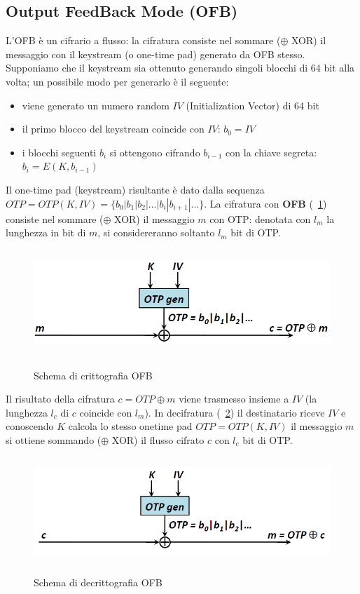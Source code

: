 \subsection{Output FeedBack Mode (OFB)} \label{par:ofb}
L'OFB è un cifrario a flusso: la cifratura consiste nel sommare ($\oplus$ XOR) il messaggio con il keystream (o one-time pad) generato da OFB stesso. Supponiamo che il keystream sia ottenuto generando singoli blocchi di 64 bit alla volta; un possibile modo per generarlo è il seguente:
\begin{itemize}
	\item viene generato un numero random $IV$ (Initialization Vector) di 64 bit
	\item il primo blocco del keystream coincide con $IV$: $b_{0} = IV$
	\item i blocchi seguenti $b_{i}$ si ottengono cifrando $b_{i-1}$ con la chiave segreta: $b_{i} = E(K,b_{i-1})$
\end{itemize}
Il one-time pad (keystream) risultante è dato dalla sequenza $OTP = OTP(K, IV) = \{b_{0}|b_{1}|b_{2}|...|b_{i}|b_{i+1}|...\}$. La cifratura con \textbf{OFB} (\figurename ~\ref{fig:OFB_enc}) consiste nel sommare ($\oplus$ XOR) il messaggio $m$ con OTP: denotata con $l_{m}$ la lunghezza in bit di $m$, si considereranno soltanto $l_{m}$ bit di OTP.
\begin{figure}[htbp]
	\centering%
	\subfigure%
	{\includegraphics[height=4cm, width=12cm, keepaspectratio]{Immagini/modalita_operative/OFB_enc.png}}
	\caption{Schema di crittografia OFB \label{fig:OFB_enc}} 	
\end{figure}
Il risultato della cifratura $c = OTP \oplus m$ viene trasmesso insieme a $IV$ (la lunghezza $l_{c}$ di $c$ coincide con $l_{m}$).\newline
In decifratura (\figurename ~\ref{fig:OFB_dec}) il destinatario riceve $IV$ e conoscendo $K$ calcola lo stesso onetime pad $OTP = OTP(K, IV)$  il messaggio $m$ si ottiene sommando ($\oplus$ XOR) il flusso cifrato $c$ con $l_{c}$ bit di OTP.
\begin{figure}[htbp]
	\centering%
	\subfigure%
	{\includegraphics[height=4cm, width=12cm, keepaspectratio]{Immagini/modalita_operative/OFB_dec.png}}
	\caption{Schema di decrittografia OFB \label{fig:OFB_dec}} 	
\end{figure}
